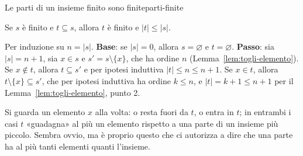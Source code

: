 \begin{concetto}
\begin{Lemma}{Le parti di un insieme finito sono finite}{parti-finite}
    \begin{prerequisiti}
    \end{prerequisiti}
    Se $s$ è finito e $t \subseteq s$, allora $t$ è finito e $|t| \leq |s|$.
\end{Lemma}
\begin{dimostrazione}
    Per induzione su $n = |s|$. \textbf{Base}: se $|s| = 0$, allora $s = \varnothing$ e $t = \varnothing$. \textbf{Passo}: sia $|s| = n + 1$, sia
    $x \in s$ e $s' = s \setminus \{x\}$, che ha ordine $n$ (Lemma~\ref{lem:togli-elemento}).
    Se $x \notin t$, allora $t \subseteq s'$ e per ipotesi induttiva $|t| \leq n \leq n + 1$. Se $x \in t$, allora $t \setminus \{x\} \subseteq s'$, che
    per ipotesi induttiva ha ordine $k \leq n$, e $|t| = k + 1 \leq n + 1$ per il Lemma~\ref{lem:togli-elemento}, punto 2.
\end{dimostrazione}
\end{concetto}

\begin{spiegazione}
    Si guarda un elemento $x$ alla volta: o resta fuori da $t$, o entra in $t$; in entrambi i casi $t$ «guadagna» al più un
    elemento rispetto a una parte di un insieme più piccolo. Sembra ovvio, ma è proprio questo che ci autorizza a dire che una
    parte ha al più tanti elementi quanti l'insieme.
\end{spiegazione}

